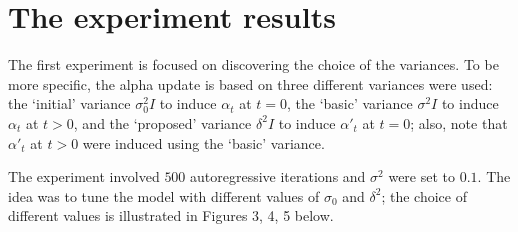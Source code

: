 \documentclass[12pt]{article}
\begin{document}
\section*{The experiment results}

\par The first experiment is focused on discovering the choice of the variances. To be more specific, the alpha update is based on three different variances were used: the `initial' variance $\sigma_0^2I$ to induce $\alpha_t$ at $t=0$, the `basic' variance $\sigma^2I$ to induce $\alpha_t$ at $t>0$, and the `proposed' variance $\delta^2I$ to induce $\alpha'_t$ at $t=0$; also, note that $\alpha'_t$ at $t>0$ were induced using the `basic' variance.

\par The experiment involved $500$ autoregressive iterations and $\sigma^2$ were set to $0.1$. The idea was to tune the model with different values of $\sigma_0$ and $\delta^2$; the choice of different values is illustrated in Figures 3, 4, 5 below.
\end{document}
